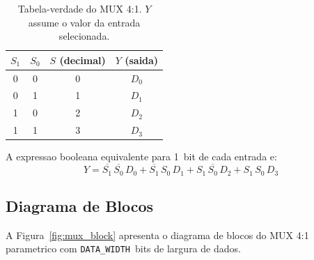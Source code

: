 \documentclass[12pt, a4paper]{article}
\begin{document}
\begin{table}[H]
\centering
\caption{Tabela-verdade do MUX 4:1. $Y$ assume o valor da entrada selecionada.}
\label{tab:verdade}
\begin{tabular}{cccc}
\toprule
$S_1$ & $S_0$ & $S$ (decimal) & $Y$ (saida)\\
\midrule
0 & 0 & 0 & $D_0$ \\
0 & 1 & 1 & $D_1$ \\
1 & 0 & 2 & $D_2$ \\
1 & 1 & 3 & $D_3$ \\
\bottomrule
\end{tabular}
\end{table}

A expressao booleana equivalente para 1~bit de cada entrada e:
\begin{equation}
  Y = \overline{S_1}\,\overline{S_0}\,D_0
    + \overline{S_1}\,S_0\,D_1
    + S_1\,\overline{S_0}\,D_2
    + S_1\,S_0\,D_3
  \label{eq:mux_bool}
\end{equation}

\subsection{Diagrama de Blocos}

A Figura~\ref{fig:mux_block} apresenta o diagrama de blocos do MUX 4:1 parametrico
com \texttt{DATA\_WIDTH}~bits de largura de dados.
\end{document}
